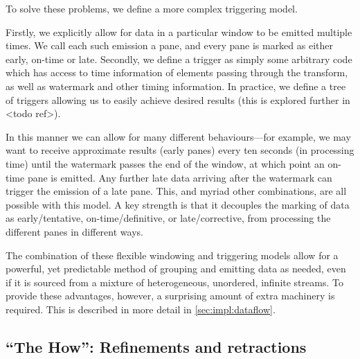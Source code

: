 To solve these problems, we define a more complex triggering model.

Firstly, we explicitly allow for data in a particular window to be emitted multiple times.
We call each such emission a pane, and every pane is marked as either early, on-time or late.
Secondly, we define a trigger as simply some arbitrary code which has access to time information of elements passing through the transform, as well as watermark and other timing information.
In practice, we define a tree of triggers allowing us to easily achieve desired results (this is explored further in <todo ref>). 

In this manner we can allow for many different behaviours---for example, we may want to receive approximate results (early panes) every ten seconds (in processing time) until the watermark passes the end of the window, at which point an on-time pane is emitted.
Any further late data arriving after the watermark can trigger the emission of a late pane.
This, and myriad other combinations, are all possible with this model.
A key strength is that it decouples the marking of data as early/tentative, on-time/definitive, or late/corrective, from processing the different panes in different ways.


The combination of these flexible windowing and triggering models allow for a powerful, yet predictable method of grouping and emitting data as needed, even if it is sourced from a mixture of heterogeneous, unordered, infinite streams.
To provide these advantages, however, a surprising amount of extra machinery is required.
This is described in more detail in \cref{sec:impl:dataflow}.

\subsection{``The How'': Refinements and retractions}\label{sec:prep:dataflow:how}

